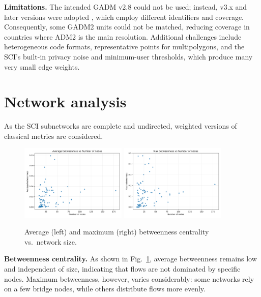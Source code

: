 \textbf{Limitations.}  
The intended GADM v2.8 could not be used; instead, v3.x and later versions were adopted \cite{gadm}, which employ different identifiers and coverage. Consequently, some GADM2 units could not be matched, reducing coverage in countries where ADM2 is the main resolution. Additional challenges include heterogeneous code formats, representative points for multipolygons, and the SCI’s built-in privacy noise and minimum-user thresholds, which produce many very small edge weights.

\section{Network analysis}
As the SCI subnetworks are complete and undirected, weighted versions of classical metrics are considered.

\begin{figure}[h!]
    \centering
    \includegraphics[width=0.45\textwidth]{images/TASK3/metrics_betweenness_avg_vs_n_nodes.png}
    \includegraphics[width=0.45\textwidth]{images/TASK3/metrics_betweenness_max_vs_n_nodes.png}
    \caption{Average (left) and maximum (right) betweenness centrality vs.\ network size.}
    \label{fig:betweenness}
\end{figure}

\textbf{Betweenness centrality.}  
As shown in Fig.~\ref{fig:betweenness}, average betweenness remains low and independent of size, indicating that flows are not dominated by specific nodes.  
Maximum betweenness, however, varies considerably: some networks rely on a few bridge nodes, while others distribute flows more evenly.

